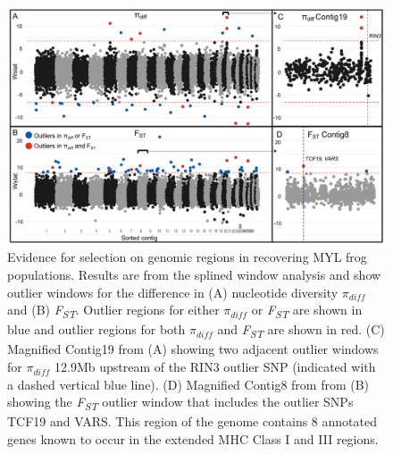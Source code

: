 \documentclass[9pt,twocolumn,twoside,lineno]{pnas-new}
\begin{document}
\begin{figure}

{\centering \includegraphics[width=\textwidth]{figures/splinewindow_manhattan.png}

}

\caption{\label{fig-spline-manhattan}Evidence for selection on genomic
regions in recovering MYL frog populations. Results are from the splined
window analysis and show outlier windows for the difference in (A)
nucleotide diversity \(\pi_{diff}\) and (B) \emph{F\textsubscript{ST}}.
Outlier regions for either \(\pi_{diff}\) or \emph{F\textsubscript{ST}}
are shown in blue and outlier regions for both \(\pi_{diff}\) and
\emph{F\textsubscript{ST}} are shown in red. (C) Magnified Contig19 from
(A) showing two adjacent outlier windows for \(\pi_{diff}\) 12.9Mb
upstream of the RIN3 outlier SNP (indicated with a dashed vertical blue
line). (D) Magnified Contig8 from from (B) showing the
\emph{F\textsubscript{ST}} outlier window that includes the outlier SNPs
TCF19 and VARS. This region of the genome contains 8 annotated genes
known to occur in the extended MHC Class I and III regions.}

\end{figure}

\newpage
\end{document}
